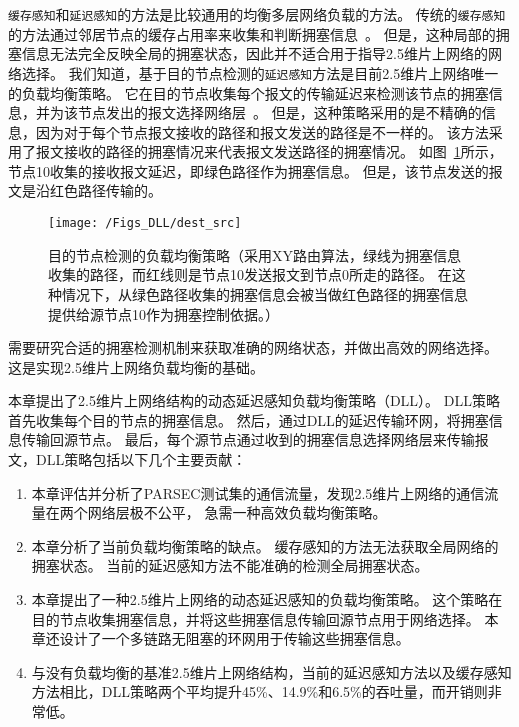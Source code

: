 \texttt{缓存感知}和\texttt{延迟感知}的方法是比较通用的均衡多层网络负载的方法。
传统的\texttt{缓存感知}的方法通过邻居节点的缓存占用率来收集和判断拥塞信息~。
但是，这种局部的拥塞信息无法完全反映全局的拥塞状态，因此并不适合用于指导2.5维片上网络的网络选择。
我们知道，基于目的节点检测的\texttt{延迟感知}方法是目前2.5维片上网络唯一的负载均衡策略。
它在目的节点收集每个报文的传输延迟来检测该节点的拥塞信息，并为该节点发出的报文选择网络层~。
但是，这种策略采用的是不精确的信息，因为对于每个节点报文接收的路径和报文发送的路径是不一样的。
该方法采用了报文接收的路径的拥塞情况来代表报文发送路径的拥塞情况。
如图~\ref{fig:dest_src}所示，节点10收集的接收报文延迟，即绿色路径作为拥塞信息。
但是，该节点发送的报文是沿红色路径传输的。

\begin{figure}[htbp] %
  \centering
  \texttt{[image: /Figs\_DLL/dest\_src]}
  \caption{目的节点检测的负载均衡策略（采用XY路由算法，绿线为拥塞信息收集的路径，而红线则是节点10发送报文到节点0所走的路径。
  在这种情况下，从绿色路径收集的拥塞信息会被当做红色路径的拥塞信息提供给源节点10作为拥塞控制依据。）}
  \label{fig:dest_src}
\end{figure}

需要研究合适的拥塞检测机制来获取准确的网络状态，并做出高效的网络选择。
这是实现2.5维片上网络负载均衡的基础。

本章提出了2.5维片上网络结构的动态延迟感知负载均衡策略（DLL）。
DLL策略首先收集每个目的节点的拥塞信息。
然后，通过DLL的延迟传输环网，将拥塞信息传输回源节点。
最后，每个源节点通过收到的拥塞信息选择网络层来传输报文，DLL策略包括以下几个主要贡献：
\renewcommand*\theenumi{(\alph{enumi})}
\begin{enumerate}
\setlength\itemsep{1pt}
\item 本章评估并分析了PARSEC测试集的通信流量，发现2.5维片上网络的通信流量在两个网络层极不公平，
急需一种高效负载均衡策略。

\item 本章分析了当前负载均衡策略的缺点。
缓存感知的方法无法获取全局网络的拥塞状态。
当前的延迟感知方法不能准确的检测全局拥塞状态。

\item 本章提出了一种2.5维片上网络的动态延迟感知的负载均衡策略。
这个策略在目的节点收集拥塞信息，并将这些拥塞信息传输回源节点用于网络选择。
本章还设计了一个多链路无阻塞的环网用于传输这些拥塞信息。

\item 与没有负载均衡的基准2.5维片上网络结构，当前的延迟感知方法以及缓存感知方法相比，DLL策略两个平均提升45\%、14.9\%和6.5\%的吞吐量，而开销则非常低。
\end{enumerate}

